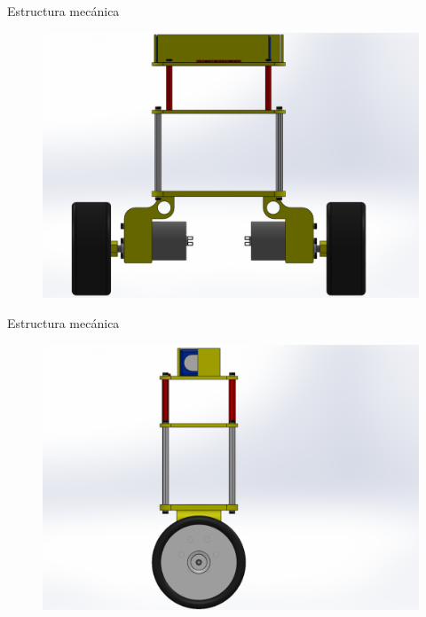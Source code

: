 \documentclass{beamer}
\begin{document}
\begin{frame}{Estructura mecánica}
\begin{center}
	\begin{figure}[H]
		\center
		\includegraphics[trim = 1cm 0mm 2.7cm 0mm,clip, angle=0, scale = 0.35]{imagenes/Balancing_Robot/EnsanBalanceFront.PDF}
	\end{figure}
\end{center}
\end{frame}

\begin{frame}{Estructura mecánica}
\begin{center}
	\begin{figure}[H]
		\center
		\includegraphics[trim = 5cm 0mm 10cm 0mm,clip, angle=0, scale = 0.35]{imagenes/Balancing_Robot/EnsanBalanceLateral.PDF}
	\end{figure}
\end{center}
\end{frame}
\end{document}
